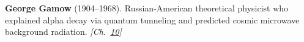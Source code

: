 \textbf{George Gamow} (1904–1968). Russian-American theoretical physicist who explained alpha decay via quantum tunneling and predicted cosmic microwave background radiation. \emph{[Ch.~\hyperref[ch:solarfusionquantumtunneling]{10}]}

